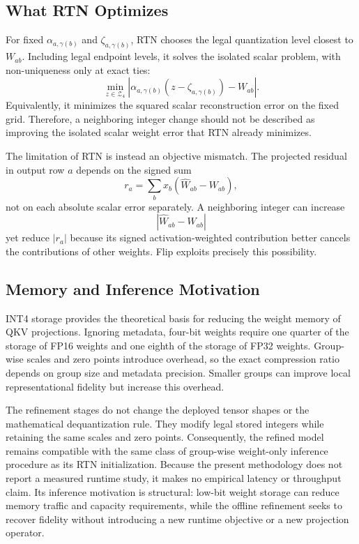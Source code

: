 \subsection{What RTN Optimizes}

For fixed $\alpha_{a,\gamma(b)}$ and $\zeta_{a,\gamma(b)}$, RTN chooses the legal quantization level closest to $W_{ab}$. Including legal endpoint levels, it solves the isolated scalar problem, with non-uniqueness only at exact ties:
\begin{equation}
\min_{z\in\mathcal{Z}_4}
\left|
\alpha_{a,\gamma(b)}
\left(z-\zeta_{a,\gamma(b)}\right)-W_{ab}
\right|.
\end{equation}
Equivalently, it minimizes the squared scalar reconstruction error on the fixed grid. Therefore, a neighboring integer change should not be described as improving the isolated scalar weight error that RTN already minimizes.

The limitation of RTN is instead an objective mismatch. The projected residual in output row $a$ depends on the signed sum
\begin{equation}
r_a=\sum_b x_b(\hat W_{ab}-W_{ab}),
\end{equation}
not on each absolute scalar error separately. A neighboring integer can increase
\begin{equation}
|\hat W_{ab}-W_{ab}|
\end{equation}
yet reduce $|r_a|$ because its signed activation-weighted contribution better cancels the contributions of other weights. Flip exploits precisely this possibility.

\subsection{Memory and Inference Motivation}

INT4 storage provides the theoretical basis for reducing the weight memory of QKV projections. Ignoring metadata, four-bit weights require one quarter of the storage of FP16 weights and one eighth of the storage of FP32 weights. Group-wise scales and zero points introduce overhead, so the exact compression ratio depends on group size and metadata precision. Smaller groups can improve local representational fidelity but increase this overhead.

The refinement stages do not change the deployed tensor shapes or the mathematical dequantization rule. They modify legal stored integers while retaining the same scales and zero points. Consequently, the refined model remains compatible with the same class of group-wise weight-only inference procedure as its RTN initialization. Because the present methodology does not report a measured runtime study, it makes no empirical latency or throughput claim. Its inference motivation is structural: low-bit weight storage can reduce memory traffic and capacity requirements, while the offline refinement seeks to recover fidelity without introducing a new runtime objective or a new projection operator.

